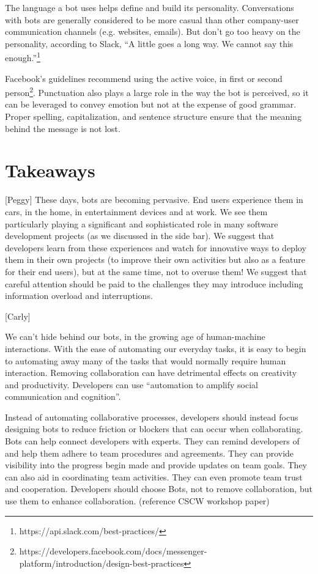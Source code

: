 \documentclass{sig-alternate}
\begin{document}
	The language a bot uses helps define and build its personality.  Conversations with bots are generally considered to be more casual than other company-user communication channels (e.g. websites, emails). But don't go too heavy on the personality, according to Slack, ``A little goes a long way. We cannot say this enough.''\footnote{https://api.slack.com/best-practices/}

	Facebook's guidelines recommend using the active voice, in first or second person\footnote{https://developers.facebook.com/docs/messenger-platform/introduction/design-best-practices}.  Punctuation also plays a large role in the way the bot is perceived, so it can be leveraged to convey emotion but not at the expense of good grammar.  Proper spelling, capitalization, and sentence structure ensure that the meaning behind the message is not lost.  

\section{Takeaways}

	[Peggy]
	These days, bots are becoming pervasive.  End users experience them in cars, in the home, in entertainment devices and at work.  We see them particularly playing a significant and sophisticated role in many software development projects (as we discussed in the side bar).  
	We suggest that developers learn from these experiences and watch for innovative ways to deploy them in their own projects (to improve their own activities but also as a feature for their end users), but at the same time, not to overuse them! 
	We suggest that careful attention should be paid to the challenges they may introduce including information overload and interruptions.  
	
	
	[Carly]

	We can't hide behind our bots, in the growing age of human-machine interactions.  With the ease of automating our everyday tasks, it is easy to begin to automating away many of the tasks that would normally require human interaction. Removing collaboration can have detrimental effects on creativity and productivity. Developers can use ``automation to amplify social communication and cognition''.

	Instead of automating collaborative processes, developers should instead focus designing bots to reduce friction or blockers that can occur when collaborating. Bots can help connect developers with experts. They can remind developers of and help them adhere to team procedures and agreements. They can provide visibility into the progress begin made and provide updates on team goals. They can also aid in coordinating team activities. They can even promote team trust and cooperation. Developers should choose Bots, not to remove collaboration, but use them to enhance collaboration. (reference CSCW workshop paper)
\end{document}
